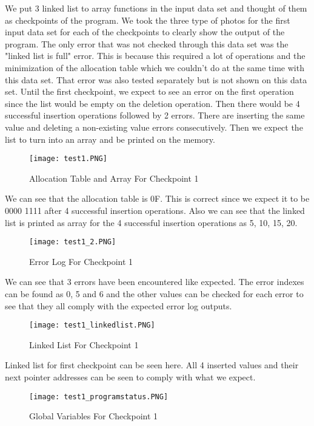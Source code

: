 \documentclass[pdftex,12pt,a4paper]{article}
\begin{document}
We put 3 linked list to array functions in the input data set and thought of them as checkpoints of the program. We took the three type of photos for the first input data set for each of the checkpoints to clearly show the output of the program. The only error that was not checked through this data set was the "linked list is full" error. This is because this required a lot of operations and the minimization of the allocation table which we couldn't do at the same time with this data set. That error was also tested separately but is not shown on this data set. Until the first checkpoint, we expect to see an error on the first operation since the list would be empty on the deletion operation. Then there would be 4 successful insertion operations followed by 2 errors. There are inserting the same value and deleting a non-existing value errors consecutively. Then we expect the list to turn into an array and be printed on the memory.

\begin{figure}[H]
	\centering
	\texttt{[image: test1.PNG]}	
	\caption{Allocation Table and Array For Checkpoint 1}
	\label{fig1}
\end{figure}

We can see that the allocation table is 0F. This is correct since we expect it to be 0000 1111 after 4 successful insertion operations. Also we can see that the linked list is printed as array for the 4 successful insertion operations as 5, 10, 15, 20.

\begin{figure}[H]
	\centering
	\texttt{[image: test1\_2.PNG]}	
	\caption{Error Log For Checkpoint 1}
	\label{fig1}
\end{figure}

We can see that 3 errors have been encountered like expected. The error indexes can be found as 0, 5 and 6 and the other values can be checked for each error to see that they all comply with the expected error log outputs.

\begin{figure}[H]
	\centering
	\texttt{[image: test1\_linkedlist.PNG]}	
	\caption{Linked List For Checkpoint 1}
	\label{fig1}
\end{figure}

Linked list for first checkpoint can be seen here. All 4 inserted values and their next pointer addresses can be seen to comply with what we expect.

\begin{figure}[H]
	\centering
	\texttt{[image: test1\_programstatus.PNG]}	
	\caption{Global Variables For Checkpoint 1}
	\label{fig1}
\end{figure}
\end{document}
